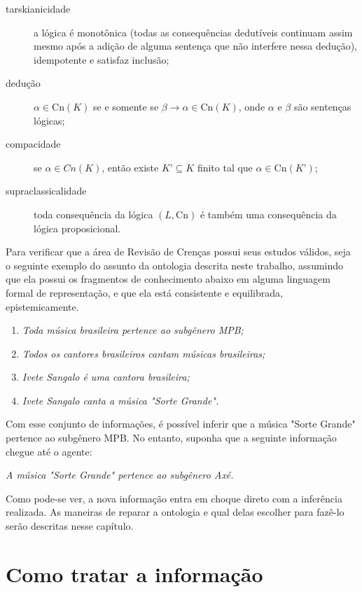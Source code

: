 \begin{description}
	\item[tarskianicidade] a lógica é monotônica (todas as consequências dedutíveis continuam assim mesmo após a adição de alguma sentença que não interfere nessa dedução), idempotente e satisfaz inclusão;
	\item[dedução] $ \alpha \in \text{Cn}(K) $ se e somente se $ \beta \to \alpha \in \text{Cn}(K) $, onde $ \alpha $ e $ \beta $ são sentenças lógicas;
	\item[compacidade] se $ \alpha \in Cn(K) $, então existe $ K’ \subseteq K $ finito tal que $ \alpha \in \text{Cn}(K’) $;
	\item[supraclassicalidade] toda consequência da lógica $ (L, \text{Cn}) $ é também uma consequência da lógica proposicional.
\end{description} 

Para verificar que a área de Revisão de Crenças possui seus estudos válidos, seja o seguinte exemplo do assunto da ontologia descrita neste trabalho, assumindo que ela possui os fragmentos de conhecimento abaixo em alguma linguagem formal de representação, e que ela está consistente e equilibrada, epistemicamente.

\begin{enumerate}
	\item \textit{Toda música brasileira pertence ao subgênero MPB;}
	\item \textit{Todos os cantores brasileiros cantam músicas brasileiras;}
	\item \textit{Ivete Sangalo é uma cantora brasileira;}
	\item \textit{Ivete Sangalo canta a música "Sorte Grande".}
\end{enumerate}

Com esse conjunto de informações, é possível inferir que a música "Sorte Grande" pertence ao subgênero MPB. No entanto, suponha que a seguinte informação chegue até o agente:

\begin{center}
	\textit{A música "Sorte Grande" pertence ao subgênero Axé.}
\end{center}

Como pode-se ver, a nova informação entra em choque direto com a inferência realizada. As maneiras de reparar a ontologia e qual delas escolher para fazê-lo serão descritas nesse capítulo.

\section{Como tratar a informação}
